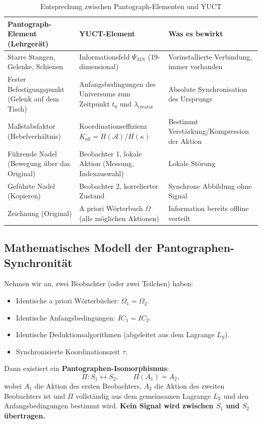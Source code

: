 \documentclass[12pt,a4paper]{article}
\begin{document}
	\begin{table}[htbp]
		\centering
		\caption{Entsprechung zwischen Pantograph-Elementen und YUCT}
		\label{tab:pantograf}
		\begin{tabular}{|p{3.5cm}|p{3.5cm}|p{5.5cm}|}
			\hline
			\textbf{Pantograph-Element (Lehrgerät)} & \textbf{YUCT-Element} & \textbf{Was es bewirkt} \\
			\hline
			Starre Stangen, Gelenke, Schienen & Informationsfeld \(\Psi_{MN}\) (19-dimensional) & Vorinstallierte Verbindung, immer vorhanden \\
			\hline
			Fester Befestigungspunkt (Gelenk auf dem Tisch) & Anfangsbedingungen des Universums zum Zeitpunkt \(t_0\) und \(\lambda_{\mathrm{creator}}\) & Absolute Synchronisation des Ursprungs \\
			\hline
			Maßstabsfaktor (Hebelverhältnis) & Koordinationseffizienz \(K_{\mathrm{eff}} = H(\mathcal{A})/H(\kappa)\) & Bestimmt Verstärkung/Kompression der Aktion \\
			\hline
			Führende Nadel (Bewegung über das Original) & Beobachter 1, lokale Aktion (Messung, Indexauswahl) & Lokale Störung \\
			\hline
			Geführte Nadel (Kopieren) & Beobachter 2, korrelierter Zustand & Synchrone Abbildung ohne Signal \\
			\hline
			Zeichnung (Original) & A priori Wörterbuch \(\Omega\) (alle möglichen Aktionen) & Information bereits offline verteilt \\
			\hline
		\end{tabular}
	\end{table}
	
	\subsection{Mathematisches Modell der Pantographen-Synchronität}
	
	Nehmen wir an, zwei Beobachter (oder zwei Teilchen) haben:
	\begin{itemize}
		\item Identische a priori Wörterbücher: \(\Omega_1 = \Omega_2\).
		\item Identische Anfangsbedingungen: \(IC_1 = IC_2\).
		\item Identische Deduktionsalgorithmen (abgeleitet aus dem Lagrange \(L_Y\)).
		\item Synchronisierte Koordinationszeit \(\tau\).
	\end{itemize}
	
	Dann existiert ein \textbf{Pantographen-Isomorphismus}:
	\[
	\Pi: S_1 \leftrightarrow S_2, \qquad \Pi(A_1) = A_2,
	\]
	wobei \(A_1\) die Aktion des ersten Beobachters, \(A_2\) die Aktion des zweiten Beobachters ist und \(\Pi\) vollständig aus dem gemeinsamen Lagrange \(L_Y\) und den Anfangsbedingungen bestimmt wird. \textbf{Kein Signal wird zwischen \(S_1\) und \(S_2\) übertragen.}
	
\end{document}
